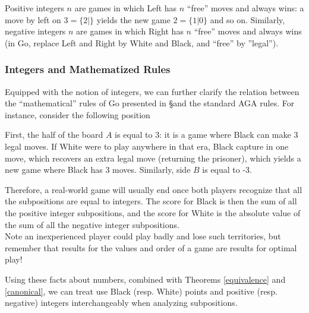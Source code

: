 \documentclass[../math194_paper.tex]{subfiles}
\begin{document}
Positive integers $n$ are games in which Left has $n$ ``free'' moves and
always wins: a move by left on $3 = \{2 \mid \}$ yields the new game $2 = \{1 | 0\}$ and so on.
Similarly, negative integers $n$ are games in which Right has $n$ ``free'' moves and always 
wins (in Go, replace Left and Right by White and Black, and ``free'' by ''legal'').

\subsubsection{Integers and Mathematized Rules}

Equipped with the notion of integers, we can further clarify the relation 
between the ``mathematical'' rules of Go presented in \S and the standard AGA 
rules. For instance, consider the following position
\begin{figure}[H]
\centering
\begin{psgoboard*}[4]
\end{psgoboard*}
\end{figure}
First, the half of the board $A$ is equal to 3: it is a game where Black can make 
3 legal moves.  If White were to play anywhere in that era, Black capture in one move, 
which recovers an extra legal move (returning the prisoner), which yields a new 
game where Black has $3$ moves. 
Similarly, side $B$ is equal to -3. 

Therefore, a real-world game will usually end once both players recognize that all the
subpositions are equal to integers. The score for Black is then the sum of all the 
positive integer subpositions, and the score for White is the absolute value of the 
sum of all the negative integer subpositions. \\

Note an inexperienced player could play badly and lose such territories, but 
remember that results for the values and order of a game are results for optimal play!

Using these facts about numbers, combined with Theorems \ref{equivalence} and 
\ref{canonical}, we can treat use Black  (resp. White) points and positive (resp. negative) 
integers interchangeably when analyzing subpositions.
\end{document}
